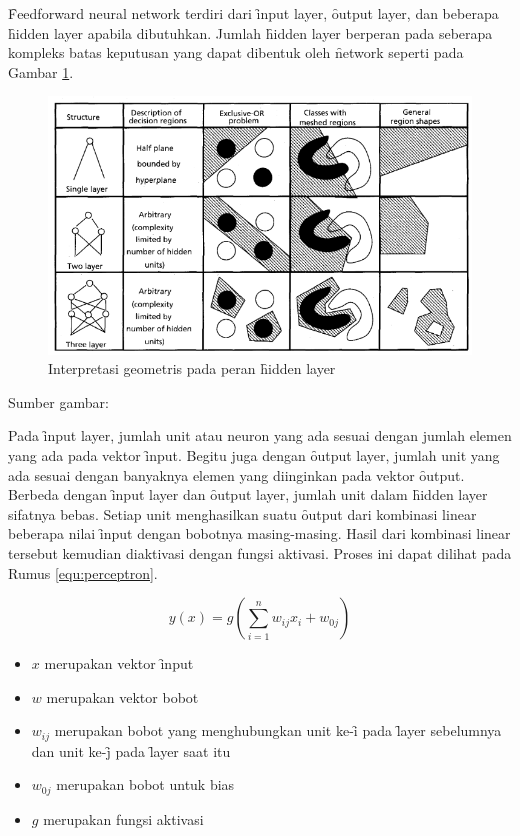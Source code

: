 \f{Feedforward neural network} terdiri dari \f{input layer}, \f{output layer}, dan beberapa \f{hidden layer} apabila dibutuhkan. Jumlah \f{hidden layer} berperan pada seberapa kompleks batas keputusan yang dapat dibentuk oleh \f{network} seperti pada Gambar \ref{fig:hl}.

\begin{figure}
	\centering
	\includegraphics[width=1\textwidth,height=0.6\textwidth]
	{pics/hl.png}
	\caption{Interpretasi geometris pada peran \f{hidden layer}}
	\label{fig:hl}
\end{figure}
\vspace{-1.2cm}
\begin{center}
	{\small Sumber gambar: \cite{jain}}
\end{center}

Pada \f{input layer}, jumlah unit atau neuron yang ada sesuai dengan jumlah elemen yang ada pada vektor \f{input}. Begitu juga dengan \f{output layer}, jumlah unit yang ada sesuai dengan banyaknya elemen yang diinginkan pada vektor \f{output}. Berbeda dengan \f{input layer} dan \f{output layer}, jumlah unit dalam \f{hidden layer} sifatnya bebas. Setiap unit menghasilkan suatu \f{output} dari kombinasi linear beberapa nilai \f{input} dengan bobotnya masing-masing. Hasil dari kombinasi linear tersebut kemudian diaktivasi dengan fungsi aktivasi. Proses ini dapat dilihat pada Rumus \ref{equ:perceptron}.

\begin{equation}
\label{equ:perceptron}
y(x) = g\left(\sum\limits_{i=1}^{n} w_{ij}x_{i} + w_{0j}\right)
\end{equation}

\begin{itemize}
	\item $x$ merupakan vektor \f{input}
	\item $w$ merupakan vektor bobot
	\item $w_{ij}$ merupakan bobot yang menghubungkan unit ke-\f{i} pada \f{layer} sebelumnya dan unit ke-\f{j} pada \f{layer} saat itu
	\item $w_{0j}$ merupakan bobot untuk bias
	\item $g$ merupakan fungsi aktivasi
\end{itemize}

